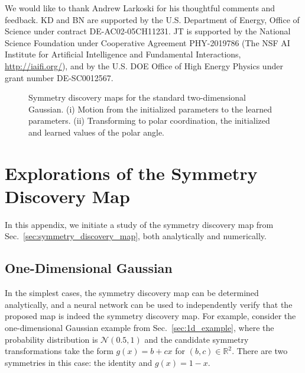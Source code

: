 \documentclass[aps,prx,reprint,preprintnumbers,superscriptaddress,nofootinbib,longbibliography,floatfix]{revtex4-1}
\newcommand{\R}{\mathbb{R}}
\DeclareRobustCommand{\Sec}[1]{Sec.~\ref{sec:#1}}
\begin{document}
We would like to thank Andrew Larkoski for his thoughtful comments and feedback.
%
KD and BN are supported by the U.S. Department of Energy, Office of Science under contract DE-AC02-05CH11231.
JT is supported by the National Science Foundation under Cooperative Agreement PHY-2019786 (The NSF AI Institute for Artificial Intelligence and Fundamental Interactions, \url{http://iaifi.org/}), and by the U.S. DOE Office of High Energy Physics under grant number DE-SC0012567.

\appendix

\begin{figure*}
    \centering
    
    \caption{Symmetry discovery maps for the standard two-dimensional Gaussian.
    (i) Motion from the initialized parameters to the learned parameters.
    (ii)
    Transforming to polar coordination, the initialized and learned values of the polar angle.}
\end{figure*}

\section{Explorations of the Symmetry Discovery Map}
\label{app:symmetry_discovery_map}

In this appendix, we initiate a study of the symmetry discovery map from \Sec{symmetry_discovery_map}, both analytically and numerically.



\subsection{One-Dimensional Gaussian}

In the simplest cases, the symmetry discovery map can be determined analytically, and a neural network can be used to independently verify that the proposed map is indeed the symmetry discovery map.
%
For example, consider the one-dimensional Gaussian example from \Sec{1d_example}, where the probability distribution is $\mathcal N(0.5, 1)$ and the candidate symmetry transformations take the form $g(x) = b + cx$ for $(b, c)\in\R^2$.
%
There are two symmetries in this case: the identity and $g(x)=1-x$.
\end{document}
